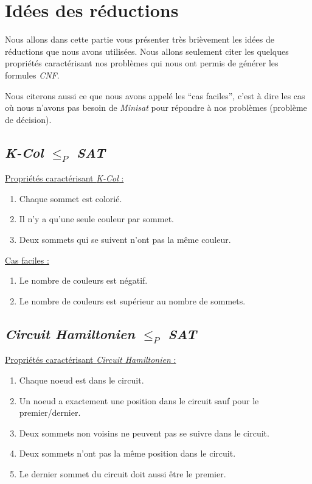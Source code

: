  \section{Idées des réductions}
 Nous allons dans cette partie vous présenter très brièvement les idées
 de réductions que nous avons utilisées. Nous allons seulement citer les
 quelques propriétés caractérisant nos problèmes qui nous ont permis de
 générer les formules \emph{CNF}.
 
 Nous citerons aussi ce que nous avons appelé les ``cas
 faciles'', c'est à dire les cas où nous n'avons pas besoin de
 \emph{Minisat} pour répondre à nos problèmes (problème de décision).

  \subsection{\emph{K-Col} $\leq_P$ \emph{SAT}}
  \underline{Propriétés caractérisant \emph{K-Col} :}
  \begin{enumerate}
   \item Chaque sommet est colorié.
   \item Il n'y a qu'une seule couleur par sommet.
   \item Deux sommets qui se suivent n'ont pas la même couleur.
  \end{enumerate}

  \underline{Cas faciles :}
  \begin{enumerate}
   \item Le nombre de couleurs est négatif.
   \item Le nombre de couleurs est supérieur au nombre de sommets.
  \end{enumerate}

  \subsection{\emph{Circuit Hamiltonien} $\leq_P$ \emph{SAT}}
  \underline{Propriétés caractérisant \emph{Circuit Hamiltonien} :}
  \begin{enumerate}
   \item Chaque noeud est dans le circuit.
   \item Un noeud a exactement une position dans le circuit sauf pour le
	 premier/dernier.
   \item Deux sommets non voisins ne peuvent pas se suivre dans le
	 circuit.
   \item Deux sommets n'ont pas la même position dans le circuit.
   \item Le dernier sommet du circuit doit aussi être le premier.
  \end{enumerate}

